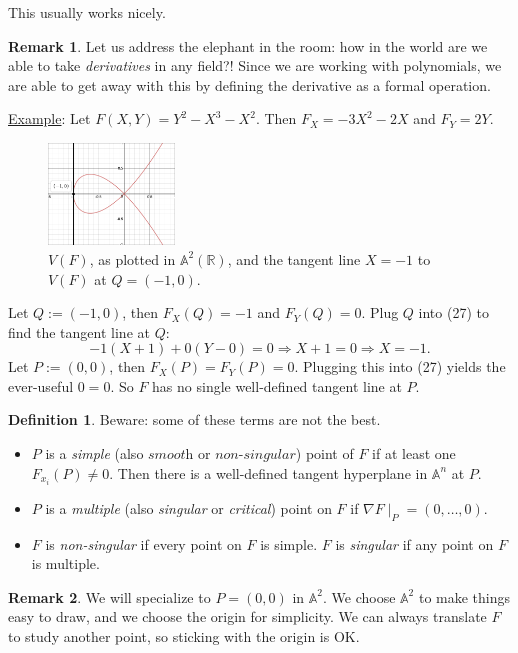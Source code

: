 \documentclass[12pt]{article}
\newcommand{\real}{\mathbb{R}}
\newcommand{\ita}[1]{\textit{#1}}
\theoremstyle{definition}
\newtheorem{definition}[theorem]{Definition}
\newtheorem*{remark}{Remark}
\begin{document}
This usually works nicely.
\begin{remark}
   Let us address the elephant in the room: how in the world are we able to take \ita{derivatives} in any field?! Since we are working with polynomials, we are able to get away with this by defining the derivative as a formal operation.
\end{remark}
\underline{Example}:  Let $F(X,Y)=Y^2-X^3-X^2$. Then $F_X=-3X^2-2X$ and $F_Y=2Y$.
\begin{figure}[H]
    \centering
    \includegraphics[width=0.3\textwidth]{18.png}
    \caption{$V(F)$, as plotted in $\mathbb{A}^2(\real)$, and the tangent line $X=-1$ to $V(F)$ at $Q=(-1,0)$.}
\end{figure}
Let $Q:=(-1,0)$, then $F_X(Q)=-1$ and $F_Y(Q)=0$. Plug $Q$ into (27) to find the tangent line at $Q$:
\[-1(X+1)+0(Y-0)=0\Rightarrow X+1=0\Rightarrow X=-1.\]
Let $P:=(0,0)$, then $F_X(P)=F_Y(P)=0$. Plugging this into (27) yields the ever-useful $0=0$. So $F$ has no single well-defined tangent line at $P$.
\begin{definition}
    Beware: some of these terms are not the best.
    \begin{itemize}
        \item $P$ is a \ita{simple} (also $\ita{smooth}$ or $\ita{non-singular}$) point of $F$ if at least one $F_{x_i}(P)\neq0$. Then there is a well-defined tangent hyperplane in $\mathbb{A}^n$ at $P$.
        \item $P$ is a \ita{multiple} (also \ita{singular} or \ita{critical}) point on $F$ if $\nabla F\mid_P=(0,\dotsc,0)$.
        \item $F$ is \ita{non-singular} if every point on $F$ is simple. $F$ is \ita{singular} if any point on $F$ is multiple.
    \end{itemize}
\end{definition}
\begin{remark}
   We will specialize to $P=(0,0)$ in $\mathbb{A}^2$. We choose $\mathbb{A}^2$ to make things easy to draw, and we choose the origin for simplicity. We can always translate $F$ to study another point, so sticking with the origin is OK.
\end{remark}
\end{document}
